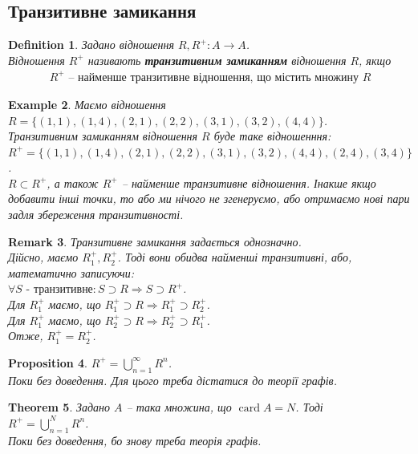 \documentclass[a4paper, 14pt]{extarticle}
\def\huge{\displaystyle}
\theoremstyle{theoremdd}
\newtheorem{theorem}{Theorem}[subsection]
\theoremstyle{theoremdd}
\newtheorem{definition}[theorem]{Definition}
\theoremstyle{theoremdd}
\theoremstyle{theoremdd}
\theoremstyle{theoremdd}
\newtheorem{example}[theorem]{Example}
\theoremstyle{theoremdd}
\theoremstyle{theoremdd}
\theoremstyle{theoremdd}
\theoremstyle{theoremdd}
\newtheorem{proposition}[theorem]{Proposition}
\theoremstyle{theoremdd}
\theoremstyle{theoremdd}
\newtheorem{remark}[theorem]{Remark}
\theoremstyle{theoremdd}
\theoremstyle{theoremdd}
\theoremstyle{theoremdd}
\theoremstyle{theoremdd}
\DeclareMathOperator{\card}{card}
\begin{document}
\subsection{Транзитивне замикання}
\begin{definition}
Задано відношення $R, R^+ \colon A \to A$.\\
Відношення $R^+$ називають \textbf{транзитивним замиканням} відношення $R$, якщо
\begin{align*}
R^+ \text{ -- найменше транзитивне відношення, що містить множину } R
\end{align*}
\end{definition}

\begin{example}
Маємо відношення \\ $R = \{(1,1),(1,4),(2,1),(2,2),(3,1),(3,2),(4,4)\}$.\\
Транзитивним замиканням відношення $R$ буде таке відношенння:\\
$R^+ = \{(1,1),(1,4),(2,1),(2,2),(3,1),(3,2),(4,4),(2,4),(3,4)\}$.\\
$R \subset R^+$, а також $R^+$ -- найменше транзитивне відношення. Інакше якщо добавити інші точки, то або ми нічого не згенеруємо, або отримаємо нові пари задля збереження транзитивності.
\end{example}

\begin{remark}
Транзитивне замикання задається однозначно.\\
Дійсно, маємо $R_1^+, R_2^+$. Тоді вони обидва найменші транзитивні, або, математично записуючи:\\
$\forall S \text{ - транзитивне}: S \supset R \Rightarrow S \supset R^+$.\\
Для $R_1^+$ маємо, що $R_1^+ \supset R \Rightarrow R_1^+ \supset R_2^+$.\\
Для $R_1^+$ маємо, що $R_2^+ \supset R \Rightarrow R_2^+ \supset R_1^+$.\\
Отже, $R_1^+ = R_2^+$.
\end{remark}

\begin{proposition}
$R^+ = \huge \bigcup_{n=1}^\infty R^n$.\\
\textit{Поки без доведення. Для цього треба дістатися до теорії графів.}
\end{proposition}

\begin{theorem}
Задано $A$ -- така множина, що $\card A = N$. Тоді\\
$R^+ = \huge \bigcup_{n=1}^N R^n$.\\
\textit{Поки без доведення, бо знову треба теорія графів.}
\end{theorem}
\end{document}
